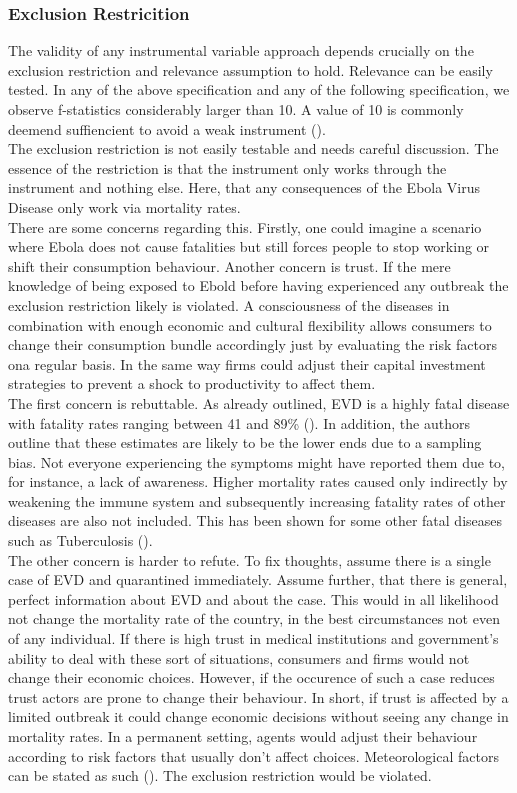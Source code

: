 \documentclass{article}
\begin{document}
\subsubsection{Exclusion Restricition}
The validity of any instrumental variable approach depends crucially on the exclusion restriction and relevance assumption to hold. Relevance can be easily tested. In any of the above specification and any of the following specification, we observe f-statistics considerably larger than 10. A value of 10 is commonly deemend suffiencient to avoid a weak instrument (\cite{stock2002testing}). \\
The exclusion restriction is not easily testable and needs careful discussion. The essence of the restriction is that the instrument only works through the instrument and nothing else. Here, that any consequences of the Ebola Virus Disease only work via mortality rates.\\
There are some concerns regarding this. Firstly, one could imagine a scenario where Ebola does not cause fatalities but still forces people to stop working or shift their consumption behaviour. Another concern is trust. If the mere knowledge of being exposed to Ebold before having experienced any outbreak the exclusion restriction likely is violated. A consciousness of the diseases in combination with enough economic and cultural flexibility allows consumers to change their consumption bundle accordingly just by evaluating the risk factors ona regular basis. In the same way firms could adjust their capital investment strategies to prevent a shock to productivity to affect them.\\
The first concern is rebuttable. As already outlined, EVD is a highly fatal disease with fatality rates ranging between 41 and 89\% (\cite{chowell2014transmission}). In addition, the authors outline that these estimates are likely to be the lower ends due to a sampling bias. Not everyone experiencing the symptoms might have reported them due to, for instance, a lack of awareness. Higher mortality rates caused only indirectly by weakening the immune system and subsequently increasing fatality rates of other diseases are also not included. This has been shown for some other fatal diseases such as Tuberculosis (\cite{parpia2016effects}).\\
The other concern is harder to refute. To fix thoughts, assume there is a single case of EVD and quarantined immediately. Assume further, that there is general, perfect information about EVD and about the case. This would in all likelihood not change the mortality rate of the country, in the best circumstances not even of any individual. If there is high trust in medical institutions and government's ability to deal with these sort of situations, consumers and firms would not change their economic choices. However, if the occurence of such a case reduces trust actors are prone to change their behaviour. In short, if trust is affected by a limited outbreak it could change economic decisions without seeing any change in mortality rates. In a permanent setting, agents would adjust their behaviour according to risk factors that usually don't affect choices. Meteorological factors can be stated as such (\cite{alexander2015factors}). The exclusion restriction would be violated. \\
\end{document}
